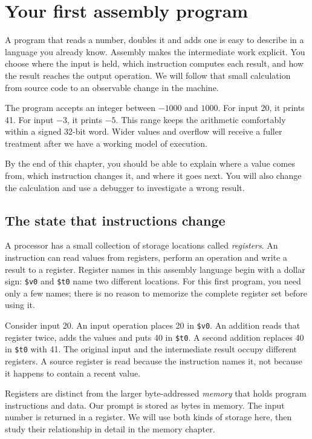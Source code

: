 \chapter{Your first assembly program}
\label{revision:first-program}

A program that reads a number, doubles it and adds one is easy to describe in a
language you already know. Assembly makes the intermediate work explicit. You
choose where the input is held, which instruction computes each result, and how
the result reaches the output operation. We will follow that small calculation
from source code to an observable change in the machine.

The program accepts an integer between $-1000$ and $1000$. For input 20, it prints
41. For input $-3$, it prints $-5$. This range keeps the arithmetic comfortably
within a signed 32-bit word. Wider values and overflow will receive a fuller
treatment after we have a working model of execution.

By the end of this chapter, you should be able to explain where a value comes
from, which instruction changes it, and where it goes next. You will also change
the calculation and use a debugger to investigate a wrong result.

\section{The state that instructions change}

A processor has a small collection of storage locations called \emph{registers}.
An instruction can read values from registers, perform an operation and write a
result to a register. Register names in this assembly language begin with a dollar
sign: \texttt{\$v0} and \texttt{\$t0} name two different locations. For this first
program, you need only a few names; there is no reason to memorize the complete
register set before using it.

Consider input 20. An input operation places 20 in \texttt{\$v0}. An addition reads
that register twice, adds the values and puts 40 in \texttt{\$t0}. A second addition
replaces 40 in \texttt{\$t0} with 41. The original input and the intermediate result
occupy different registers. A source register is read because the instruction names
it, not because it happens to contain a recent value.

Registers are distinct from the larger byte-addressed \emph{memory} that holds
program instructions and data. Our prompt is stored as bytes in memory. The input
number is returned in a register. We will use both kinds of storage here, then
study their relationship in detail in the memory chapter.

